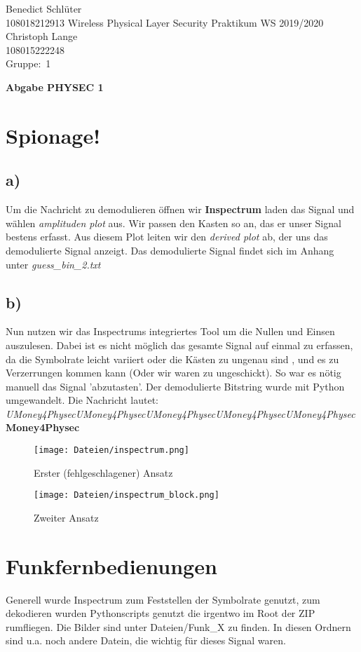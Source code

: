 \documentclass[12pt,a4paper]{article}
\newcommand{\student}{Benedict Schlüter\\ 108018212913 } %
\newcommand{\partner}{Christoph Lange\\ 108015222248} %
\newcommand{\group}{1} %
\newcommand{\hwheadtwo}{$ $
  \vspace{-2cm}
  
\noindent \student \qquad \qquad  Wireless Physical Layer Security Praktikum \hfill WS 2019/2020 \\
\noindent \partner \\
\noindent Gruppe:~\group\\
$ $

  
\begin{center}    
{\Large \bf Abgabe PHYSEC 1}
\end{center}
}
\begin{document}
\hwheadtwo

\section{Spionage!}
\subsection*{a)}
Um die Nachricht zu demodulieren öffnen wir \textbf{Inspectrum} laden das Signal und wählen \textit{amplituden plot} aus. Wir passen den Kasten so an, das er unser Signal bestens erfasst. Aus diesem Plot leiten wir den \textit{derived plot} ab, der uns das demodulierte Signal anzeigt. Das demodulierte Signal findet sich im Anhang unter \textit{guess\_bin\_2.txt}
\subsection*{b)}
Nun nutzen wir das Inspectrums integriertes Tool um die Nullen und Einsen auszulesen. Dabei ist es nicht möglich das gesamte Signal auf einmal zu erfassen, da die Symbolrate leicht variiert oder die Kästen zu ungenau sind , und es zu Verzerrungen kommen kann (Oder wir waren zu ungeschickt). So war es nötig manuell das Signal 'abzutasten'. Der demodulierte Bitstring wurde mit Python umgewandelt. Die Nachricht lautet: \\\textit{UMoney4PhysecUMoney4PhysecUMoney4PhysecUMoney4PhysecUMoney4Physec} \textbf{Money4Physec}
\begin{figure}[ht]
\centering
\texttt{[image: Dateien/inspectrum.png]} 
\caption{Erster (fehlgeschlagener) Ansatz}
\label{fig:1}
\end{figure}
\begin{figure}[ht]
\centering
\texttt{[image: Dateien/inspectrum\_block.png]} 
\caption{Zweiter Ansatz}
\label{fig:2}
\end{figure}

\newpage
\section{Funkfernbedienungen}
Generell wurde Inspectrum zum Feststellen der Symbolrate genutzt, zum dekodieren wurden Pythonscripts genutzt die irgentwo im Root der ZIP rumfliegen. Die Bilder sind unter Dateien/Funk{\_}X zu finden. In diesen Ordnern sind u.a. noch andere Datein, die wichtig für dieses Signal waren.
\end{document}
